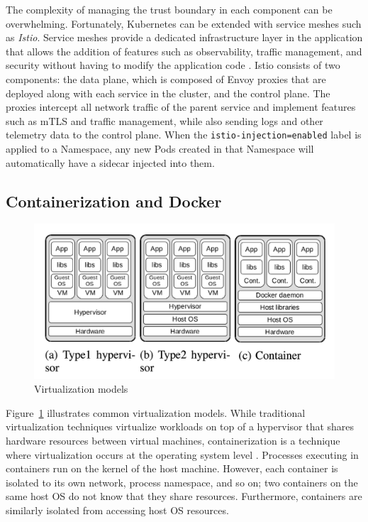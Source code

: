 \documentclass[english, 12pt, a4paper, sci, utf8, a-2b, online]{aaltothesis}
\begin{document}
The complexity of managing the trust boundary in each component can be overwhelming.
Fortunately, Kubernetes can be extended with service meshes such as \emph{Istio}.
Service meshes provide a dedicated infrastructure layer in the application that allows the addition of features such as observability, traffic management, and security without having to modify the application code \cite{istio}.
Istio consists of two components: the data plane, which is composed of Envoy proxies that are deployed along with each service in the cluster, and the control plane.
The proxies intercept all network traffic of the parent service and implement features such as mTLS and traffic management, while also sending logs and other telemetry data to the control plane.
When the \lstinline{istio-injection=enabled} label is applied to a Namespace, any new Pods created in that Namespace will automatically have a sidecar injected into them.

\subsection{Containerization and Docker}

\begin{figure}[h!]
  \centering
  \includegraphics[width=\linewidth]{files/figure-1.png}
  \caption{Virtualization models \cite{combe2016docker}} %
  \label{figure-1}
\end{figure}

Figure~\ref{figure-1} illustrates common virtualization models.
While traditional virtualization techniques virtualize workloads on top of a hypervisor that shares hardware resources between virtual machines, containerization is a technique where virtualization occurs at the operating system level \cite{merkel2014docker}.
Processes executing in containers run on the kernel of the host machine.
However, each container is isolated to its own network, process namespace, and so on; two containers on the same host OS do not know that they share resources.
Furthermore, containers are similarly isolated from accessing host OS resources.
\end{document}
